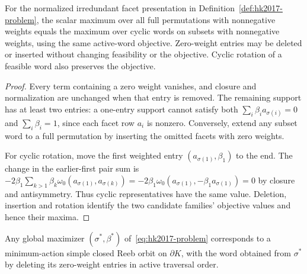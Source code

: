 \begin{unverified}
\begin{lemma}
\label{lem:hk2017-full-to-subset-words}
For the normalized irredundant facet presentation in
Definition~\ref{def:hk2017-problem}, the scalar maximum over all full
permutations with nonnegative weights equals the maximum over cyclic words
on subsets with nonnegative weights, using the same active-word objective.
Zero-weight entries may be deleted or inserted without changing feasibility
or the objective.  Cyclic rotation of a feasible word also preserves the
objective.
\end{lemma}

\begin{proof}
Every term containing a zero weight vanishes, and closure and normalization
are unchanged when that entry is removed.  The remaining support has at least
two entries: a one-entry support cannot satisfy both
$\sum_i\beta_i a_{\sigma(i)}=0$ and $\sum_i\beta_i=1$, since each facet row
$a_i$ is nonzero.  Conversely, extend any subset word to a full permutation
by inserting the omitted facets with zero weights.

For cyclic rotation, move the first weighted entry
$(a_{\sigma(1)},\beta_1)$ to the
end.  The change in the earlier-first pair sum is
$-2\beta_1\sum_{k>1}\beta_k\omega_0(a_{\sigma(1)},a_{\sigma(k)})
=-2\beta_1\omega_0(a_{\sigma(1)},-\beta_1a_{\sigma(1)})=0$
by closure and antisymmetry.
Thus cyclic representatives have the same value.  Deletion, insertion and
rotation identify the two candidate families' objective values and hence
their maxima.
\end{proof}
\end{unverified}

\begin{fact}[Consequence of HK2017]\label{fact:hk2017}
Any global maximizer $(\sigma^*, \beta^*)$
of~\eqref{eq:hk2017-problem}
corresponds to a minimum-action simple closed Reeb orbit on
$\partial K$, with the word obtained from $\sigma^*$ by deleting its
zero-weight entries in active traversal order.
\end{fact}

